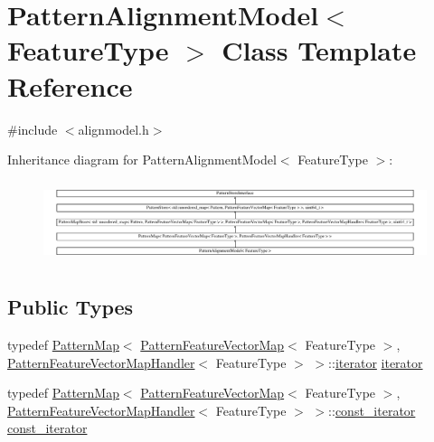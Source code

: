 \hypertarget{classPatternAlignmentModel}{}\section{Pattern\+Alignment\+Model$<$ Feature\+Type $>$ Class Template Reference}
\label{classPatternAlignmentModel}


{\ttfamily \#include $<$alignmodel.\+h$>$}

Inheritance diagram for Pattern\+Alignment\+Model$<$ Feature\+Type $>$\+:\begin{figure}[H]
\begin{center}
\leavevmode
\includegraphics[height=2.397260cm]{classPatternAlignmentModel}
\end{center}
\end{figure}
\subsection*{Public Types}
\begin{DoxyCompactItemize}
\item 
typedef \hyperlink{classPatternMap}{Pattern\+Map}$<$ \hyperlink{classPatternFeatureVectorMap}{Pattern\+Feature\+Vector\+Map}$<$ Feature\+Type $>$, \hyperlink{classPatternFeatureVectorMapHandler}{Pattern\+Feature\+Vector\+Map\+Handler}$<$ Feature\+Type $>$ $>$\+::\hyperlink{classPatternAlignmentModel_a108db1926176ea0b761a8329fc73e3e7}{iterator} \hyperlink{classPatternAlignmentModel_a108db1926176ea0b761a8329fc73e3e7}{iterator}
\item 
typedef \hyperlink{classPatternMap}{Pattern\+Map}$<$ \hyperlink{classPatternFeatureVectorMap}{Pattern\+Feature\+Vector\+Map}$<$ Feature\+Type $>$, \hyperlink{classPatternFeatureVectorMapHandler}{Pattern\+Feature\+Vector\+Map\+Handler}$<$ Feature\+Type $>$ $>$\+::\hyperlink{classPatternAlignmentModel_ac8d8a6556af4672ceb0f29d7cfaa9db4}{const\+\_\+iterator} \hyperlink{classPatternAlignmentModel_ac8d8a6556af4672ceb0f29d7cfaa9db4}{const\+\_\+iterator}
\end{DoxyCompactItemize}
